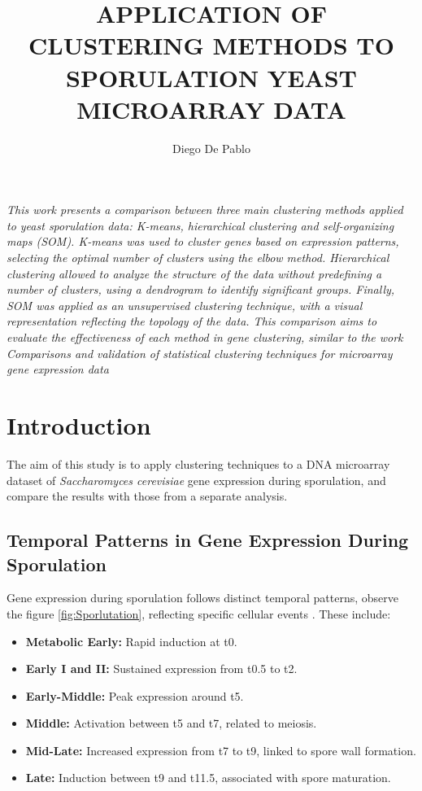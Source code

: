 \documentclass{llncs}
\begin{document}
\title{APPLICATION OF CLUSTERING METHODS TO
	SPORULATION YEAST MICROARRAY DATA}

\author{Diego De Pablo}

\maketitle 

\vspace{1cm} %

\textit{This work presents a comparison between three main clustering methods applied to yeast sporulation data: K-means, hierarchical clustering and self-organizing maps (SOM). K-means was used to cluster genes based on expression patterns, selecting the optimal number of clusters using the elbow method. Hierarchical clustering allowed to analyze the structure of the data without predefining a number of clusters, using a dendrogram to identify significant groups. Finally, SOM was applied as an unsupervised clustering technique, with a visual representation reflecting the topology of the data. This comparison aims to evaluate the effectiveness of each method in gene clustering, similar to the work Comparisons and validation of statistical clustering techniques for microarray gene expression data}



\section{Introduction}


The aim of this study is to apply clustering techniques to a DNA microarray dataset of \textit{Saccharomyces cerevisiae} gene expression during sporulation, and compare the results with those from a separate analysis.


\subsection*{Temporal Patterns in Gene Expression During Sporulation}

Gene expression during sporulation follows distinct temporal patterns, observe the figure \ref{fig:Sporlutation}, reflecting specific cellular events \cite{chu1998}. These include:
\begin{itemize}
	\item \textbf{Metabolic Early:} Rapid induction at t0.
	\item \textbf{Early I and II:} Sustained expression from t0.5 to t2.
	\item \textbf{Early-Middle:} Peak expression around t5.
	\item \textbf{Middle:} Activation between t5 and t7, related to meiosis.
	\item \textbf{Mid-Late:} Increased expression from t7 to t9, linked to spore wall formation.
	\item \textbf{Late:} Induction between t9 and t11.5, associated with spore maturation.
\end{itemize}
\vspace{-25pt}
\end{document}
